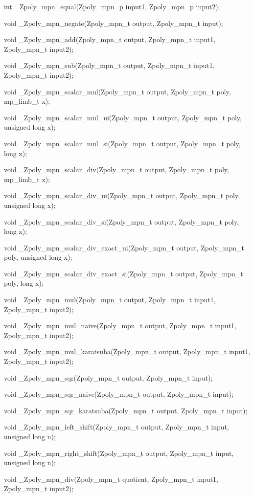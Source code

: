 \documentclass[a4paper,10pt]{article}
\begin{document}
int \_Zpoly\_mpn\_equal(Zpoly\_mpn\_p input1, Zpoly\_mpn\_p input2);

void \_Zpoly\_mpn\_negate(Zpoly\_mpn\_t output, Zpoly\_mpn\_t input);

void \_Zpoly\_mpn\_add(Zpoly\_mpn\_t output, Zpoly\_mpn\_t input1, Zpoly\_mpn\_t input2);

void \_Zpoly\_mpn\_sub(Zpoly\_mpn\_t output, Zpoly\_mpn\_t input1, Zpoly\_mpn\_t input2);

void \_Zpoly\_mpn\_scalar\_mul(Zpoly\_mpn\_t output, Zpoly\_mpn\_t poly, mp\_limb\_t \* x);

void \_Zpoly\_mpn\_scalar\_mul\_ui(Zpoly\_mpn\_t output, Zpoly\_mpn\_t poly, unsigned long x);

void \_Zpoly\_mpn\_scalar\_mul\_si(Zpoly\_mpn\_t output, Zpoly\_mpn\_t poly, long x);

void \_Zpoly\_mpn\_scalar\_div(Zpoly\_mpn\_t output, Zpoly\_mpn\_t poly, mp\_limb\_t \* x);

void \_Zpoly\_mpn\_scalar\_div\_ui(Zpoly\_mpn\_t output, Zpoly\_mpn\_t poly, unsigned long x);

void \_Zpoly\_mpn\_scalar\_div\_si(Zpoly\_mpn\_t output, Zpoly\_mpn\_t poly, long x);

void \_Zpoly\_mpn\_scalar\_div\_exact\_ui(Zpoly\_mpn\_t output, Zpoly\_mpn\_t poly, unsigned long x);

void \_Zpoly\_mpn\_scalar\_div\_exact\_si(Zpoly\_mpn\_t output, Zpoly\_mpn\_t poly, long x);

void \_Zpoly\_mpn\_mul(Zpoly\_mpn\_t output, Zpoly\_mpn\_t input1, Zpoly\_mpn\_t input2);

void \_Zpoly\_mpn\_mul\_naive(Zpoly\_mpn\_t output, Zpoly\_mpn\_t input1, Zpoly\_mpn\_t input2);

void \_Zpoly\_mpn\_mul\_karatsuba(Zpoly\_mpn\_t output, Zpoly\_mpn\_t input1, Zpoly\_mpn\_t input2);

void \_Zpoly\_mpn\_sqr(Zpoly\_mpn\_t output, Zpoly\_mpn\_t input);

void \_Zpoly\_mpn\_sqr\_naive(Zpoly\_mpn\_t output, Zpoly\_mpn\_t input);

void \_Zpoly\_mpn\_sqr\_karatsuba(Zpoly\_mpn\_t output, Zpoly\_mpn\_t input);

void \_Zpoly\_mpn\_left\_shift(Zpoly\_mpn\_t output, Zpoly\_mpn\_t input, unsigned long n);

void \_Zpoly\_mpn\_right\_shift(Zpoly\_mpn\_t output, Zpoly\_mpn\_t input, unsigned long n);

void \_Zpoly\_mpn\_div(Zpoly\_mpn\_t quotient, Zpoly\_mpn\_t input1, Zpoly\_mpn\_t input2);
\end{document}

